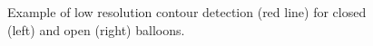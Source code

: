 \documentclass[conference]{IEEEtran}
\begin{document}
	\begin{figure}[!ht]	%
	  \centering
		\caption{Example of low resolution contour detection (red line) for closed (left) and open (right) balloons.}
		\label{fig:mono_res_det}
	\end{figure}
\end{document}
